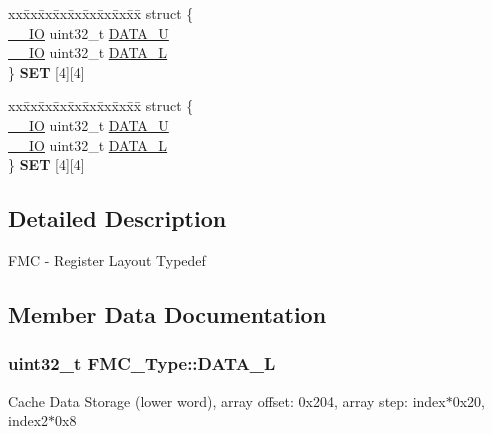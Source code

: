 \begin{DoxyCompactItemize}
\item 
\begin{tabbing}
xx\=xx\=xx\=xx\=xx\=xx\=xx\=xx\=xx\=\kill
struct \{\\
\>\hyperlink{core__sc300_8h_aec43007d9998a0a0e01faede4133d6be}{\_\_IO} uint32\_t \hyperlink{structFMC__Type_a6a67e81c770c1a5c2b6cbbd5239242c6}{DATA\_U}\\
\>\hyperlink{core__sc300_8h_aec43007d9998a0a0e01faede4133d6be}{\_\_IO} uint32\_t \hyperlink{structFMC__Type_aa05a692d9c5a040a0883079941c8a341}{DATA\_L}\\
\} {\bfseries SET} \mbox{[}4\mbox{]}\mbox{[}4\mbox{]}\hypertarget{structFMC__Type_ae3c2a5249be2374a0b13ceaba9bcd542}{}\label{structFMC__Type_ae3c2a5249be2374a0b13ceaba9bcd542}
\\

\end{tabbing}\item 
\begin{tabbing}
xx\=xx\=xx\=xx\=xx\=xx\=xx\=xx\=xx\=\kill
struct \{\\
\>\hyperlink{core__sc300_8h_aec43007d9998a0a0e01faede4133d6be}{\_\_IO} uint32\_t \hyperlink{structFMC__Type_a6a67e81c770c1a5c2b6cbbd5239242c6}{DATA\_U}\\
\>\hyperlink{core__sc300_8h_aec43007d9998a0a0e01faede4133d6be}{\_\_IO} uint32\_t \hyperlink{structFMC__Type_aa05a692d9c5a040a0883079941c8a341}{DATA\_L}\\
\} {\bfseries SET} \mbox{[}4\mbox{]}\mbox{[}4\mbox{]}\hypertarget{structFMC__Type_afddf116e4bf8f848b900977a0cb85be2}{}\label{structFMC__Type_afddf116e4bf8f848b900977a0cb85be2}
\\

\end{tabbing}\end{DoxyCompactItemize}


\subsection{Detailed Description}
F\+MC -\/ Register Layout Typedef 

\subsection{Member Data Documentation}
\subsubsection[{\texorpdfstring{D\+A\+T\+A\+\_\+L}{DATA_L}}]{ uint32\+\_\+t F\+M\+C\+\_\+\+Type\+::\+D\+A\+T\+A\+\_\+L}\hypertarget{structFMC__Type_aa05a692d9c5a040a0883079941c8a341}{}\label{structFMC__Type_aa05a692d9c5a040a0883079941c8a341}
Cache Data Storage (lower word), array offset\+: 0x204, array step\+: index$\ast$0x20, index2$\ast$0x8 
